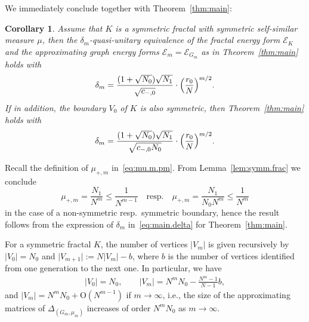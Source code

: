 \documentclass[12pt,reqno,a4paper]{amsart}            %
\numberwithin{equation}{section}
\newcommand{\myfont}{\sffamily}
\theoremstyle{mythmstyle}       %
\newtheorem{corollary}[theorem]{Corollary}
\theoremstyle{mydefstyle}        %
\let\oldendproof\endproof
\renewenvironment{proof}[1][\bfseries\myfont\proofname]{%
  \oldproof[\bfseries \myfont #1]%
}{\oldendproof}
\newcommand{\Thm}[1]{Theorem~\ref{thm:#1}}
\newcommand{\Lem}[1]{Lemma~\ref{lem:#1}}
\newcommand{\card}[1]{\lvert#1\rvert}   %
\newcommand{\1}{\mathbbm 1}                    %
\newcommand{\Err}{\mathrm O}
\newcommand{\quadtext}[1]{\quad\text{#1}\quad}
\newcommand{\energy}{\mathcal E}
\newcommand{\conductance}{c}  %
\begin{document}
We immediately conclude together with \Thm{main}:
\begin{corollary}
  \label{cor:main'}
  Assume that $K$ is a symmetric fractal with symmetric self-similar
  measure $\mu$, then the $\delta_m$-quasi-unitary equivalence of the
  fractal energy form $\energy_K$ and the approximating graph energy
  forms $\energy_m=\energy_{G_m}$ as in \Thm{main} holds with
  \begin{equation*}
    \delta_m
    =\frac{(1+\sqrt {N_0})\sqrt{N_1}}{\sqrt{\conductance_{-,0}}} \cdot 
    \Bigl(\frac {r_0} N\Bigr)^{m/2}.
  \end{equation*}
  If in addition, the boundary $V_0$ of $K$ is also symmetric, then
  \Thm{main} holds with
  \begin{equation*}
    \delta_m
    =\frac{(1+\sqrt {N_0})\sqrt{N_1}}{\sqrt{\conductance_{-,0} N_0}} \cdot 
    \Bigl(\frac {r_0} N\Bigr)^{m/2}.
  \end{equation*}
\end{corollary}
\begin{proof}
  Recall the definition of $\mu_{+,m}$ in~\eqref{eq:mu.m.pm}.  From
  \Lem{symm.frac} we conclude
  \begin{equation*}
    \mu_{+,m} 
    = \frac{N_1}{N^m} 
    \le \frac 1{N^{m-1}}
    \quadtext{resp.}
    \mu_{+,m} 
    = \frac{N_1}{N_0N^m} 
    \le \frac 1{N^m}
  \end{equation*}
  in the case of a non-symmetric resp.\ symmetric boundary, hence the
  result follows from the expression of $\delta_m$
  in~\eqref{eq:main.delta} for \Thm{main}.
\end{proof}

For a symmetric fractal $K$, the number of vertices $\card {V_m}$ is
given recursively by $\card{V_0}=N_0$ and $\card{V_{m+1}}:=N
\card{V_m} - b$, where $b$ is the number of vertices identified from
one generation to the next one.  In particular, we have
\begin{align*}
  \card{V_0}=N_0, \qquad
  \card{V_m}=N^m N_0 - \frac{N^m-1}{N-1} b,
\end{align*}
and $\card {V_m}=N^m N_0 + \Err(N^{m-1})$ if $m \to \infty$, i.e., the
size of the approximating matrices of $\Delta_{(G_m,\mu_m)}$ increases
of order $N^m N_0$ as $m \to \infty$.

\end{document}
